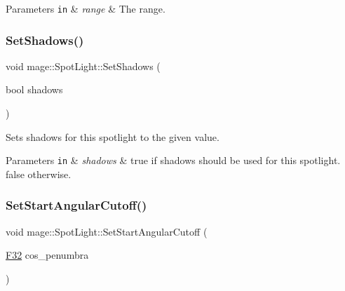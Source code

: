 \begin{DoxyParams}[1]{Parameters}
\mbox{\tt in}  & {\em range} & The range. \\
\hline
\end{DoxyParams}
\hypertarget{classmage_1_1_spot_light_a290ce2f0ce8814cac75f05322fc01cd5}{}\label{classmage_1_1_spot_light_a290ce2f0ce8814cac75f05322fc01cd5} 
\subsubsection{\texorpdfstring{Set\+Shadows()}{SetShadows()}}
{\footnotesize\ttfamily void mage\+::\+Spot\+Light\+::\+Set\+Shadows (\begin{DoxyParamCaption}\item[{bool}]{shadows }\end{DoxyParamCaption})\hspace{0.3cm}{\ttfamily [noexcept]}}

Sets shadows for this spotlight to the given value.


\begin{DoxyParams}[1]{Parameters}
\mbox{\tt in}  & {\em shadows} & {\ttfamily true} if shadows should be used for this spotlight. {\ttfamily false} otherwise. \\
\hline
\end{DoxyParams}
\hypertarget{classmage_1_1_spot_light_afae0adbfe0da1a897696a90294c93aef}{}\label{classmage_1_1_spot_light_afae0adbfe0da1a897696a90294c93aef} 
\subsubsection{\texorpdfstring{Set\+Start\+Angular\+Cutoff()}{SetStartAngularCutoff()}}
{\footnotesize\ttfamily void mage\+::\+Spot\+Light\+::\+Set\+Start\+Angular\+Cutoff (\begin{DoxyParamCaption}\item[{\hyperlink{namespacemage_aa97e833b45f06d60a0a9c4fc22ae02c0}{F32}}]{cos\+\_\+penumbra }\end{DoxyParamCaption})\hspace{0.3cm}{\ttfamily [noexcept]}}

